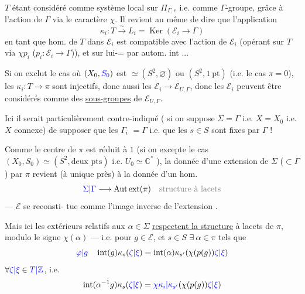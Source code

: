 
$T$ étant considéré comme système local
sur $\Pi_{\Gamma,e}$  i.e. comme $\Gamma$-groupe, grâce à l'action
de $\Gamma$ via le caractère $\chi$. Il revient au
même de dire que  l'application
\[
\kappa_i:T\xrightarrow{\sim}L_i=\operatorname{Ker}(\mathcal E_i\longrightarrow\Gamma)
\]
en tant que hom. de $T$ dans $\mathcal E_i$ est
compatible avec l'action de $\mathcal E_i$ (opérant
sur $T$ via $\chi p_i$ ($p_i:\mathcal E_i\longrightarrow\Gamma$)),  et sur
lui-= par autom. int ...

Si on exclut le cas où $(X_0,\textcolor{blue}{S_0})$
est $\simeq(S^2,\varnothing)$ ou $(S^2,1\ \mathrm{pt})$ (i.e.
le cas $\pi=0$), les $\kappa_i:T\longrightarrow\pi$ sont injectifs,
donc aussi les $\mathcal E_i\longrightarrow\mathcal E_{U,\Gamma}$, donc les
$\mathcal E_i$ peuvent être considérés comme des
\uline{sous-groupes} de $\mathcal E_{U,\Gamma}$.

\unsure{\S} Ici il  serait particulièrement
contre-indiqué ( si on suppose $\Sigma=\Gamma$ i.e.
$X=X_0$ i.e. $X$ connexe) de supposer que
les $\Gamma_i$  $=\Gamma$ i.e. que les $s\in S$ sont fixes
par $\Gamma$ !


Comme le centre de $\pi$ est réduit à $1$
(si on excepte  le cas $(X_0,S_0)\simeq(S^2,\text{deux pts})$
i.e. $U_0\simeq\mathbb C^*$ ), la donnée d'une extension
de $\Sigma$ ($\subset\Gamma$) par $\pi$ revient (à  unique
près) à la donnée d'un hom.
\[
\unsure{\Sigma|\Gamma}\longrightarrow\mathrm{Aut\,ext}(\pi)\quad\deleted{\text{structure à lacets}}
\]
 --- $\mathcal E$ se reconsti-
tue comme l'image inverse de l'extension
.

Mais ici les  extérieurs relatifs
aux $\alpha\in\Sigma$  \uline{respectent la structure}
à lacets  de $\pi$, modulo le
signe $\chi(\alpha)$ --- i.e. pour $g\in\mathcal E$, et $s\in S$
$\exists\ \alpha\in\pi$  tels que
\[
\deleted{\unsure{\varphi|g}}\quad
\operatorname{int}(g)\kappa_s(\unsure{\zeta|\xi})
=\operatorname{int}(\alpha)\kappa_{s'}(\chi(p(g))\unsure{\zeta|\xi})
\]
$\forall\textcolor{blue}{\zeta|\xi}\in\textcolor{blue}{T|\mathbb Z}$, i.e.
\[
\operatorname{int}(\alpha^{-1}g)\kappa_s(\unsure{\zeta|\xi})
=\deleted{\unsure{\chi}}\unsure{\kappa_i|\kappa_{s'}}(\chi(p(g))\unsure{\zeta|\xi})
\]

